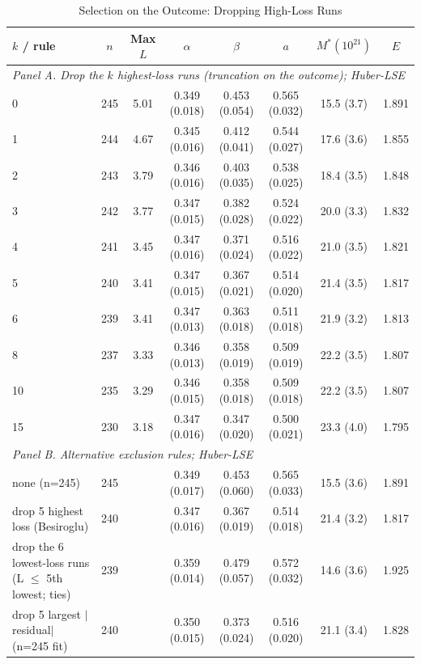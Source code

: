 \begin{table}[!htbp]
\centering
\scriptsize
\caption{Selection on the Outcome: Dropping High-Loss Runs}
\label{tab:m1_selection}
\begin{threeparttable}
\begin{tabular}{lccccccc}
\toprule
$k$ / rule & $n$ & Max $L$ & $\alpha$ & $\beta$ & $a$ & $M^*(10^{21})$ & $E$ \\
\midrule
\multicolumn{8}{l}{\textit{Panel A. Drop the $k$ highest-loss runs (truncation on the outcome); Huber-LSE}} \\
0 & 245 & 5.01 & 0.349 (0.018) & 0.453 (0.054) & 0.565 (0.032) & 15.5 (3.7) & 1.891 \\
1 & 244 & 4.67 & 0.345 (0.016) & 0.412 (0.041) & 0.544 (0.027) & 17.6 (3.6) & 1.855 \\
2 & 243 & 3.79 & 0.346 (0.016) & 0.403 (0.035) & 0.538 (0.025) & 18.4 (3.5) & 1.848 \\
3 & 242 & 3.77 & 0.347 (0.015) & 0.382 (0.028) & 0.524 (0.022) & 20.0 (3.3) & 1.832 \\
4 & 241 & 3.45 & 0.347 (0.016) & 0.371 (0.024) & 0.516 (0.022) & 21.0 (3.5) & 1.821 \\
5 & 240 & 3.41 & 0.347 (0.015) & 0.367 (0.021) & 0.514 (0.020) & 21.4 (3.5) & 1.817 \\
6 & 239 & 3.41 & 0.347 (0.013) & 0.363 (0.018) & 0.511 (0.018) & 21.9 (3.2) & 1.813 \\
8 & 237 & 3.33 & 0.346 (0.013) & 0.358 (0.019) & 0.509 (0.019) & 22.2 (3.5) & 1.807 \\
10 & 235 & 3.29 & 0.346 (0.015) & 0.358 (0.018) & 0.509 (0.018) & 22.2 (3.5) & 1.807 \\
15 & 230 & 3.18 & 0.347 (0.016) & 0.347 (0.020) & 0.500 (0.021) & 23.3 (4.0) & 1.795 \\
\multicolumn{8}{l}{\textit{Panel B. Alternative exclusion rules; Huber-LSE}} \\
none (n=245) & 245 &  & 0.349 (0.017) & 0.453 (0.060) & 0.565 (0.033) & 15.5 (3.6) & 1.891 \\
drop 5 highest loss (Besiroglu) & 240 &  & 0.347 (0.016) & 0.367 (0.019) & 0.514 (0.018) & 21.4 (3.2) & 1.817 \\
drop the 6 lowest-loss runs (L $\le$ 5th lowest; ties) & 239 &  & 0.359 (0.014) & 0.479 (0.057) & 0.572 (0.032) & 14.6 (3.6) & 1.925 \\
drop 5 largest $|$residual$|$ (n=245 fit) & 240 &  & 0.350 (0.015) & 0.373 (0.024) & 0.516 (0.020) & 21.1 (3.4) & 1.828 \\

\end{tabular}
\end{threeparttable}
\end{table}
